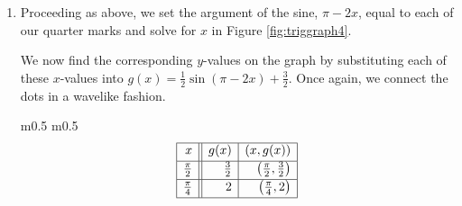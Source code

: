 {\begin{enumerate}
\begin{minipage}{\textwidth}
\begin{center}
\begin{tabular}{m{} m{}}
\[\begin{array}{|r||r|r|}
\hline

 x & f(x) & (x,f(x)) \\ [2pt] \hline
1  & 4 & (1,4) \\ [2pt]   \hline

2  & 1 & (2,1) \\ [2pt] \hline 

3 & -2 & (3,-2) \\ [2pt] \hline 

4  & 1 & (4,1) \\ [2pt] \hline 

5 & 4 & (5,4) \\  [2pt] \hline
\end{array} \]
\setlength{\extrarowheight}{0pt} & 
\end{tabular}
\end{center}
\captionsetup{type=figure}
\caption{Plotting one cycle of $y=f(x)$ in Example \ref{cosinesinegraphex1}}
\end{minipage}

\medskip

One cycle is graphed on $[1,5]$ so the period is the length of that interval which is $4$.

\item  Proceeding as above, we set the argument of the sine, $\pi - 2x$, equal to each of our quarter marks and solve for $x$ in Figure \ref{fig:triggraph4}.


We now find the corresponding $y$-values on the graph by substituting each of these $x$-values into  $g(x) = \frac{1}{2} \sin(\pi - 2x) + \frac{3}{2}$.  Once again, we connect the dots in a wavelike fashion.

\medskip

\noindent\hskip-30pt\begin{minipage}{\textwidth}
\begin{center}
\begin{tabular}{m{} m{}}
\setlength{\extrarowheight}{2pt}
\setlength{\extrarowheight}{2pt}
\[ \begin{array}{|r||r|r|}  

\hline

 x & g(x) & (x,g(x)) \\ [2pt] \hline
\frac{\pi}{2} & \frac{3}{2} & \left(\frac{\pi}{2}, \frac{3}{2}\right)  \\ [2pt]   \hline

\frac{\pi}{4} & 2 & \left(\frac{\pi}{4}, 2\right) \\ [2pt] \hline 


\end{array}\]
\end{tabular}
\end{center}
\end{minipage}
\end{enumerate}}
